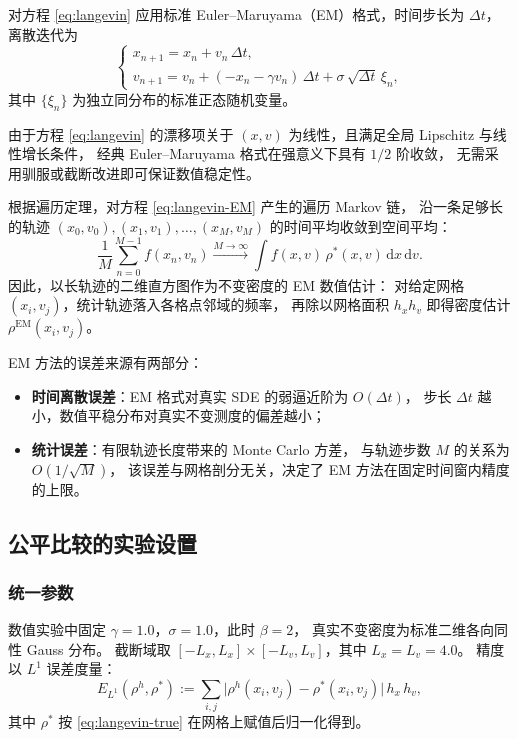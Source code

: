 	对方程 \eqref{eq:langevin} 应用标准 Euler--Maruyama（EM）格式，时间步长为 $\Delta t$，
	离散迭代为
	\begin{equation}\label{eq:langevin-EM}
		\begin{cases}
			x_{n+1} = x_n + v_n\,\Delta t, \\
			v_{n+1} = v_n + (-x_n - \gamma v_n)\,\Delta t + \sigma\,\sqrt{\Delta t}\,\xi_n,
		\end{cases}
	\end{equation}
	其中 $\{\xi_n\}$ 为独立同分布的标准正态随机变量。
	
	由于方程 \eqref{eq:langevin} 的漂移项关于 $(x, v)$ 为线性，且满足全局 Lipschitz 与线性增长条件，
	经典 Euler--Maruyama 格式在强意义下具有 $1/2$ 阶收敛，
	无需采用驯服或截断改进即可保证数值稳定性。
	
	根据遍历定理，对方程 \eqref{eq:langevin-EM} 产生的遍历 Markov 链，
	沿一条足够长的轨迹 $(x_0, v_0), (x_1, v_1), \dots, (x_M, v_M)$ 的时间平均收敛到空间平均：
	\[
	\frac{1}{M}\sum_{n=0}^{M-1} f(x_n, v_n)
	\xrightarrow{M\to\infty}
	\int f(x, v)\,\rho^*(x, v)\,\mathrm{d}x\,\mathrm{d}v.
	\]
	因此，以长轨迹的二维直方图作为不变密度的 EM 数值估计：
	对给定网格 $(x_i, v_j)$，统计轨迹落入各格点邻域的频率，
	再除以网格面积 $h_x h_v$ 即得密度估计 $\rho^{\mathrm{EM}}(x_i, v_j)$。
	
	EM 方法的误差来源有两部分：
	\begin{itemize}
		\item \textbf{时间离散误差}：EM 格式对真实 SDE 的弱逼近阶为 $O(\Delta t)$，
		步长 $\Delta t$ 越小，数值平稳分布对真实不变测度的偏差越小；
		\item \textbf{统计误差}：有限轨迹长度带来的 Monte Carlo 方差，
		与轨迹步数 $M$ 的关系为 $O(1/\sqrt{M})$，
		该误差与网格剖分无关，决定了 EM 方法在固定时间窗内精度的上限。
	\end{itemize}
	
	\subsection{公平比较的实验设置}
	
	\subsubsection{统一参数}
	
	数值实验中固定 $\gamma = 1.0$，$\sigma = 1.0$，此时 $\beta = 2$，
	真实不变密度为标准二维各向同性 Gauss 分布。
	截断域取 $[-L_x, L_x]\times[-L_v, L_v]$，其中 $L_x = L_v = 4.0$。
	精度以 $L^1$ 误差度量：
	\begin{equation}\label{eq:l1-error}
		E_{L^1}(\rho^h, \rho^*)
		:= \sum_{i,j}\bigl|\rho^h(x_i, v_j) - \rho^*(x_i, v_j)\bigr|\,h_x\,h_v,
	\end{equation}
	其中 $\rho^*$ 按 \eqref{eq:langevin-true} 在网格上赋值后归一化得到。
	
